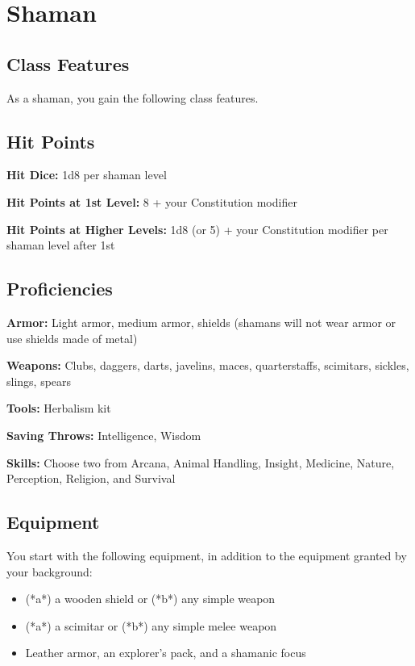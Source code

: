 \section{Shaman}

\subsection{Class Features}

As a shaman, you gain the following class features.

\subsection{Hit Points}

\textbf{Hit Dice:} 1d8 per shaman level

\textbf{Hit Points at 1st Level:} 8 + your Constitution modifier

\textbf{Hit Points at Higher Levels:} 1d8 (or 5) + your Constitution modifier per shaman level after 1st

\subsection{Proficiencies}

\textbf{Armor:} Light armor, medium armor, shields (shamans will not wear armor or use shields made of metal)

\textbf{Weapons:} Clubs, daggers, darts, javelins, maces, quarterstaffs, scimitars, sickles, slings, spears

\textbf{Tools:} Herbalism kit

\textbf{Saving Throws:} Intelligence, Wisdom

\textbf{Skills:} Choose two from Arcana, Animal Handling, Insight, Medicine, Nature, Perception, Religion, and Survival

\subsection{Equipment}

You start with the following equipment, in addition to the equipment granted by your background:
\begin{itemize}
\item (*a*) a wooden shield or (*b*) any simple weapon
\item (*a*) a scimitar or (*b*) any simple melee weapon
\item Leather armor, an explorer’s pack, and a shamanic focus
\end{itemize}

